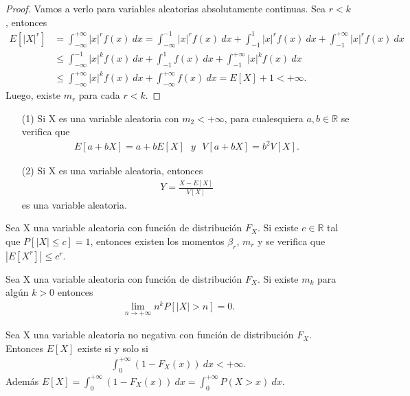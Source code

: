 \begin{proof}
Vamos a verlo para variables aleatorias absolutamente continuas. Sea $r < k$, entonces
\begin{align*}
    E[|X|^r] &= \int_{-\infty}^{+\infty}{|x|^rf(x) \ dx} = \int_{-\infty}^{-1}{|x|^rf(x) \ dx} + \int_{-1}^{1}{|x|^rf(x) \ dx} + \int_{-1}^{+\infty}{|x|^rf(x) \ dx}\\
    & \leq \int_{-\infty}^{-1}{|x|^kf(x) \ dx} + \int_{-1}^{1}{f(x) \ dx} + \int_{-1}^{+\infty}{|x|^kf(x) \ dx} \\
    & \leq \int_{-\infty}^{+\infty}{|x|^kf(x) \ dx} + \int_{-\infty}^{+\infty}{f(x) \ dx} = E[X] + 1 < +\infty.
\end{align*}
Luego, existe $m_r$ para cada $r < k$.
\end{proof}

\begin{cor}
\begin{enumerate}
    \item[(1)] Si X es una variable aleatoria con $m_2 < +\infty$, para cualesquiera $a,b \in \mathbb{R}$ se verifica que
    \begin{align*}
        E[a + bX] = a + bE[X] \ \ \ y \ \ \ V[a + bX] = b^2V[X].    
    \end{align*}
    \item[(2)] Si X es una variable aleatoria, entonces
        \begin{align*}
            Y = \frac{X - E[X]}{V[X]}
        \end{align*}
        es una variable aleatoria.
\end{enumerate}
\end{cor}

\begin{prop}
Sea X una variable aleatoria con función de distribución $F_X$. Si existe $c \in \mathbb{R}$ tal que $P[|X| \leq c] = 1$, entonces existen los momentos $\beta_r$, $m_r$ y se verifica que $|E[X^r]| \leq c^r$.
\end{prop}

\begin{teo}
Sea X una variable aleatoria con función de distribución $F_X$. Si existe $m_k$ para algún $k > 0$ entonces
\begin{align*}
    \lim_{n \to +\infty}{n^kP[|X| > n]} = 0.
\end{align*}
\end{teo}

\begin{teo}
Sea X una variable aleatoria no negativa con función de distribución $F_X$. Entonces $E[X]$ existe si y solo si
\begin{align*}
    \int_{0}^{+\infty}{(1 - F_X(x)) \ dx} < +\infty.
\end{align*}
Además $E[X] = \int_{0}^{+\infty}{(1 - F_X(x)) \ dx} = \int_{0}^{+\infty}{P(X > x)\ dx}$.
\end{teo}

